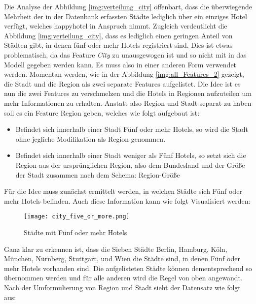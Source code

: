 Die Analyse der Abbildung \ref{img:verteilung_city} offenbart, dass die überwiegende Mehrheit der in der Datenbank erfassten Städte lediglich über ein einziges Hotel verfügt, welches happyhotel in Anspruch nimmt. Zugleich verdeutlicht die Abbildung \ref{img:verteilung_city}, dass es lediglich einen geringen Anteil von Städten gibt, in denen fünf oder mehr Hotels registriert sind. Dies ist etwas problematisch, da das Feature \emph{City} zu unausgewogen ist und so nicht mit in das Modell gegeben werden kann. Es muss also in einer anderen Form verwendet werden.
\newline
\newline
Momentan werden, wie in der Abbildung \ref{img:all_Features_2} gezeigt, die Stadt und die Region als zwei separate Features aufgelistet. Die Idee ist es nun die zwei Features zu verschmelzen und die Hotels in Regionen aufzuteilen um mehr Informationen zu erhalten. Anstatt also Region und Stadt separat zu haben soll es ein Feature Region geben, welches wie folgt aufgebaut ist: 

\begin{itemize}
    \item Befindet sich innerhalb einer Stadt Fünf oder mehr Hotels, so wird die Stadt ohne jegliche Modifikation als Region genommen.
    \item Befindet sich innerhalb einer Stadt weniger als Fünf Hotels, so setzt sich die Region aus der ursprünglichen Region, also dem Bundesland und der Größe der Stadt zusammen nach dem Schema: {Region}-{Größe}
\end{itemize}

Für die Idee muss zunächst ermittelt werden, in welchen Städte sich Fünf oder mehr Hotels befinden. Auch diese Information kann wie folgt Visualisiert werden:

\begin{figure}[h]
    \centering
    \texttt{[image: city\_five\_or\_more.png]}
    \caption[Städte mit Fünf oder mehr Hotels]{Städte mit Fünf oder mehr Hotels}
    \label{img:city_five_or_more}
\end{figure}

Ganz klar zu erkennen ist, dass die Sieben Städte Berlin, Hamburg, Köln, München, Nürnberg, Stuttgart, und Wien die Städte sind, in denen Fünf oder mehr Hotels vorhanden sind. Die aufgelisteten Städte können dementsprechend so übernommen werden und für alle anderen wird die Regel von oben angewandt.
\newline
Nach der Umformulierung von Region und Stadt sieht der Datensatz wie folgt aus:

